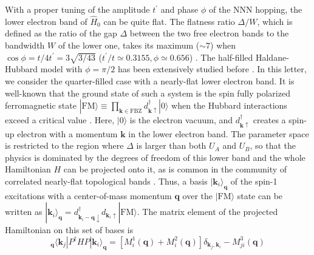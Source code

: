 \documentclass[amsmath,superscriptaddress,showpacs,aps,prl,twocolumn]{revtex4-1}
\begin{document}

\par With a proper tuning of the amplitude $t^\prime$ and phase $\phi$ of the NNN hopping, the lower electron band of $\hat{H}_0$ can be quite flat. The flatness ratio $\Delta/W$, which is defined as the ratio of the gap $\Delta$ between the two free electron bands to the bandwidth $W$ of the lower one, takes its maximum ($\sim7$) when $\cos\phi=t/4t^\prime=3\sqrt{3/43}$ ($t^\prime/t\simeq0.3155, \phi\simeq0.656$) \cite{Neupert_PRL2011}. The half-filled Haldane-Hubbard model with $\phi=\pi/2$ has been extensively studied before \cite{He_PRB2011a,Maciejko_PRB2013,Zheng_PRB2015,Hickey_PRL2016,Wu_PRB2016,Vanhala_PRL2016,Imriska_PRB2016,Giuliani_PRB2016,Garcia_NJP2018,Gu_NJP2019}. In this letter, we consider the quarter-filled case with a nearly-flat lower electron band. It is well-known that the ground state of such a system is the spin fully polarized ferromagnetic state $|\text{FM}\rangle\equiv\prod_{\mathbf{k}\in\text{FBZ}}d^\dagger_{\mathbf{k}\uparrow}|0\rangle$ when the Hubbard interactions exceed a critical value \cite{Tasaki_PRL1994,Su_PRB2019}. Here, $|0\rangle$ is the electron vacuum, and $d^\dagger_{\mathbf{k}\uparrow}$ creates a spin-up electron with a momentum $\mathbf{k}$ in the lower electron band. The parameter space is restricted to the region where $\Delta$ is larger than both $U_A$ and $U_B$, so that the physics is dominated by the degrees of freedom of this lower band and the whole Hamiltonian $H$ can be projected onto it, as is common in the community of correlated nearly-flat topological bands \cite{Neupert_PRL2011,Regnault_PRX2011,Neupert_PRB2011,Neupert_PRL2012,Su_PRB2019}. Thus, a basis $|\mathbf{k}_i\rangle_\mathbf{q}$ of the spin-1 excitations with a center-of-mass momentum $\mathbf{q}$ over the $|\text{FM}\rangle$ state can be written as $|\mathbf{k}_i\rangle_\mathbf{q}=d^\dagger_{\mathbf{k}_i-\mathbf{q}\downarrow}d_{\mathbf{k}_i\uparrow}|\text{FM}\rangle$. The matrix element of the projected Hamiltonian on this set of bases is
\begin{equation}\label{PHP}
_\mathbf{q}\langle\mathbf{k}_j|P^\dagger HP|\mathbf{k}_i\rangle_\mathbf{q}=\left[M_{i}^1(\mathbf{q})+M_{i}^2(\mathbf{q})\right]\delta_{\mathbf{k}_j,\mathbf{k}_i}-M_{ji}^3(\mathbf{q})
\end{equation}
\end{document}
